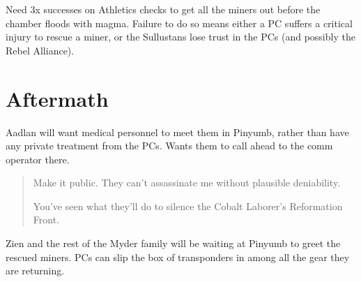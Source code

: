 \documentclass[background]{book}
\newcommand{\df}{\DifficultyDie}
\begin{document}
\begin{multicols}{2}
Need 3x successes on \df\df\df Athletics checks to get all the miners out before the chamber floods with magma.  Failure to do so means either a PC suffers a critical injury to rescue a miner, or the Sullustans lose trust in the PCs (and possibly the Rebel Alliance).

\section{Aftermath}

Aadlan will want medical personnel to meet them in Pinyumb, rather than have any private treatment from the PCs. Wants them to call ahead to the comm operator there.
\begin{quote}
Make it public. They can’t assassinate me without plausible deniability.

You’ve seen what they’ll do to silence the Cobalt Laborer’s Reformation Front.
\end{quote}

Zien and the rest of the Myder family will be waiting at Pinyumb to greet the rescued miners. PCs can slip the box of transponders in among all the gear they are returning.

\end{multicols}
\end{document}
